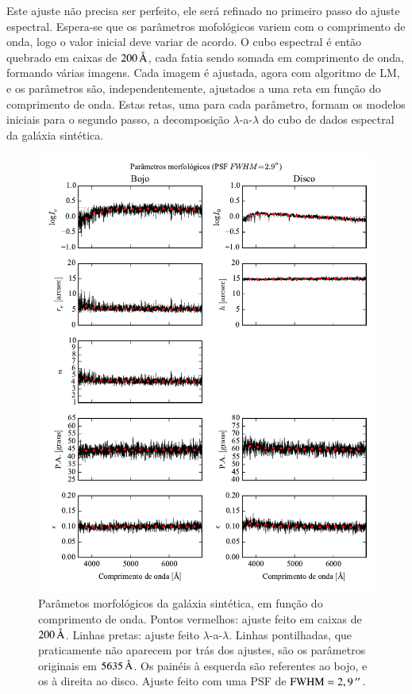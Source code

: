 Este ajuste não precisa ser perfeito, ele será refinado no primeiro passo do
ajuste espectral. Espera-se que os  parâmetros mofológicos variem com o
comprimento de onda, logo o valor inicial deve variar de acordo. O cubo
espectral é então quebrado em caixas de $200\,\text{\normalfont\AA}$, cada fatia sendo
somada em comprimento de onda, formando várias imagens. Cada imagem é ajustada,
agora com algoritmo de LM, e os parâmetros são, independentemente, ajustados a
uma reta em função do comprimento de onda. Estas retas, uma para cada parâmetro,
formam os modelos iniciais para o segundo passo, a decomposição
$\lambda$-a-$\lambda$ do cubo de dados espectral da galáxia sintética.

\begin{figure}
	\includegraphics{figuras/simulation_fitparams}
	\caption[Parâmetos morfológicos da galáxia sintética.]
	{Parâmetos morfológicos da galáxia sintética, em função do comprimento de
	onda. Pontos vermelhos: ajuste feito em caixas de $200\,\text{\normalfont\AA}$. Linhas
	pretas: ajuste feito $\lambda$-a-$\lambda$. Linhas pontilhadas, que
	praticamente não aparecem por trás dos ajustes, são os parâmetros originais em
	$5635\,\text{\normalfont\AA}$. Os painéis à esquerda são referentes ao bojo, e os à direita
	ao disco. Ajuste feito com uma PSF de $\mathrm{FWHM} = 2,9\,^{\prime\prime}$.
	}
	\label{fig:testFitParams}
\end{figure}

